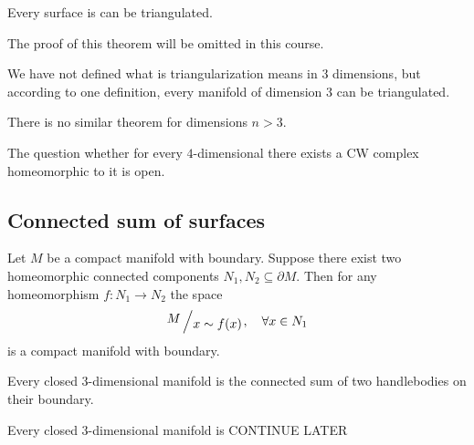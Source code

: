 \documentclass[11pt,a4paper]{article}
\begin{document}
\begin{theorem}[Rad\'o]
  Every surface is can be triangulated.
\end{theorem}
The proof of this theorem will be omitted in this course.
\begin{remark}
  We have not defined what is triangularization means in $3$ dimensions,
  but according to one definition, every manifold of dimension $3$ can be
  triangulated.
\end{remark}
\begin{remark}
  There is no similar theorem for dimensions $n > 3$.
\end{remark}
\begin{remark}
  The question whether for every $4$-dimensional there exists a CW complex
  homeomorphic to it is open.
\end{remark}

\subsection{Connected sum of surfaces}
\begin{exercise}
  Let $M$ be a compact manifold with boundary.
  Suppose there exist two homeomorphic connected components
  $N_1,N_2 \subseteq \partial M$.
  Then for any homeomorphism $f \colon N_1 \to N_2$ the space
  \[
    \bigslant{M}{x \sim f(x)}, \quad \forall x \in N_1
  \]
  is a compact manifold with boundary.
\end{exercise}

\begin{remark}
  Every closed $3$-dimensional manifold is the connected sum of two
  handlebodies on their boundary.
\end{remark}

\begin{definition}[Knot]

\end{definition}

\begin{definition}[Link]

\end{definition}

\begin{remark}
  Every closed $3$-dimensional manifold is CONTINUE LATER
\end{remark}
\end{document}
